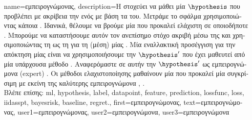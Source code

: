 {name={\foreignlanguage{greek}{εμπειρογνώμονας}},
	description={\foreignlanguage{greek}{Η}  \foreignlanguage{greek}{στοχεύει 
		να μάθει μία}  $\hypothesis$ \foreignlanguage{greek}{που προβλέπει με ακρίβεια την}  
		\foreignlanguage{greek}{ενός}  \foreignlanguage{greek}{με βάση τα}  
		\foreignlanguage{greek}{του. Μετράμε το σφάλμα}  \foreignlanguage{greek}{χρησιμοποιώντας κάποια}  
		. \foreignlanguage{greek}{Ιδανικά, θέλουμε να βρούμε μία}  
		\foreignlanguage{greek}{που προκαλεί ελάχιστη}  \foreignlanguage{greek}{σε οποιοδήποτε}
		. \foreignlanguage{greek}{Μπορούμε να καταστήσουμε αυτόν τον ανεπίσημο στόχο ακριβή μέσω της}  
		 \foreignlanguage{greek}{και χρησιμοποιώντας τη}  \foreignlanguage{greek}{ως τη}  
		 \foreignlanguage{greek}{για τη (μέση})  \foreignlanguage{greek}{μίας} 
		. \foreignlanguage{greek}{Μία εναλλακτική προσέγγιση για την απόκτηση μίας}  
		\foreignlanguage{greek}{είναι να χρησιμοποιήσουμε την}  $\hypothesis'$ \foreignlanguage{greek}{που έχει 
		μαθευτεί από μία υπάρχουσα μέθοδο} . \foreignlanguage{greek}{Αναφερόμαστε σε αυτήν την} 
		 $\hypothesis'$ \foreignlanguage{greek}{ως εμπειρογνώμονα} (expert) \cite{PredictionLearningGames}. 
		\foreignlanguage{greek}{Οι μέθοδοι ελαχιστοποίησης}  \foreignlanguage{greek}{μαθαίνουν μία}  
		 \foreignlanguage{greek}{που προκαλεί μία}  \foreignlanguage{greek}{συγκρίσιμη με 
		εκείνη της καλύτερης εμπειρογνώμονα} \cite{PredictionLearningGames}, \cite{HazanOCO}.
					\\ 
		\foreignlanguage{greek}{Βλέπε επίσης:} \gls{ml}, \gls{hypothesis}, \gls{label}, \gls{datapoint}, \gls{feature}, \gls{prediction}, 
		\gls{lossfunc}, \gls{loss}, \gls{iidasspt}, \gls{bayesrisk}, \gls{baseline}, \gls{regret}.},
	first={\foreignlanguage{greek}{εμπειρογνώμονας}},
	text={\foreignlanguage{greek}{εμπειρογνώμονας}},
	user1={\foreignlanguage{greek}{εμπειρογνώμονας}}, %
  	user2={\foreignlanguage{greek}{εμπειρογνώμονα}}, %
	user3={\foreignlanguage{greek}{εμπειρογνώμονα}} %
}

